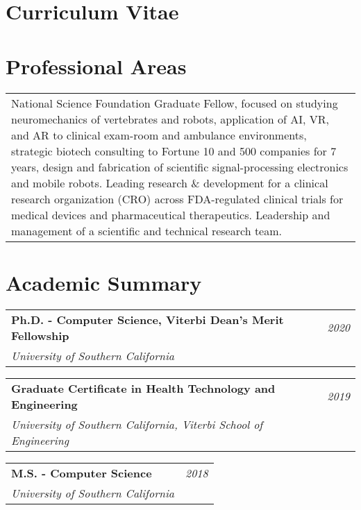 \documentclass[10pt,a4paper]{article}
\begin{document}
  \newpage

\vspace*{-10mm}\section*{\textbf{Curriculum Vitae}}
\centering{\today}
\vspace*{8mm}\section*{Professional Areas}


  \vspace*{2mm}
  \begin{tabularx}{17cm}{X}
  National Science Foundation Graduate Fellow, focused on studying neuromechanics of vertebrates and robots, application of AI, VR, and AR to clinical exam-room and ambulance environments, strategic biotech consulting to Fortune 10 and 500 companies for 7 years, design and fabrication of scientific signal-processing electronics and mobile robots. Leading research \& development for a clinical research organization (CRO) across FDA-regulated clinical trials for medical devices and pharmaceutical therapeutics. Leadership and management of a scientific and technical research team.
  \end{tabularx}

  \vspace*{5mm}\section*{Academic Summary}

  \vspace*{0mm}\noindent\begin{tabularx}{17cm}{X r}
    \textbf{Ph.D. - Computer Science, Viterbi Dean's Merit Fellowship} & \textit{2020} \\
    \textit{University of Southern California}
  \end{tabularx} 

  \vspace*{1mm}\noindent\begin{tabularx}{17cm}{X r}
    \textbf{Graduate Certificate in Health Technology and Engineering} & \textit{2019} \\ %
    \textit{University of Southern California, Viterbi School of Engineering}
  \end{tabularx} 

  \vspace*{1mm}\noindent\begin{tabularx}{17cm}{X r}
    \textbf{M.S. - Computer Science} & \textit{2018} \\ %
    \textit{University of Southern California}
  \end{tabularx} 
\end{document}
